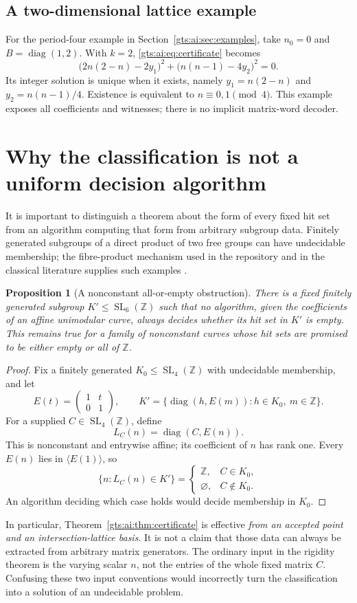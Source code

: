 \documentclass[11pt,letterpaper]{article}
\newtheorem{proposition}[theorem]{Proposition}
\theoremstyle{definition}
\theoremstyle{remark}
\newcommand{\Z}{\mathbb Z}
\newcommand{\SL}{\operatorname{SL}}
\newcommand{\diag}{\operatorname{diag}}
\begin{document}
\subsection{A two-dimensional lattice example}
For the period-four example in Section~\ref{gts:ai:sec:examples}, take $n_0=0$ and $B=\diag(1,2)$. With $k=2$, \eqref{gts:ai:eq:certificate} becomes
\[
 \bigl(2n(2-n)-2y_1\bigr)^2+
 \bigl(n(n-1)-4y_2\bigr)^2=0.
\]
Its integer solution is unique when it exists, namely
$y_1=n(2-n)$ and $y_2=n(n-1)/4$. Existence is equivalent to $n\equiv0,1\pmod4$. This example exposes all coefficients and witnesses; there is no implicit matrix-word decoder.

\section{Why the classification is not a uniform decision algorithm}\label{gts:ai:sec:uniformity}
It is important to distinguish a theorem about the form of every fixed hit set from an algorithm computing that form from arbitrary subgroup data. Finitely generated subgroups of a direct product of two free groups can have undecidable membership; the fibre-product mechanism used in the repository and in the classical literature supplies such examples \cite{ai-bogopolski,ai-repoquadratic}.

\begin{proposition}[A nonconstant all-or-empty obstruction]\label{gts:ai:prop:uniform}
There is a fixed finitely generated subgroup $K'\le\SL_6(\Z)$ such that no algorithm, given the coefficients of an affine unimodular curve, always decides whether its hit set in $K'$ is empty. This remains true for a family of nonconstant curves whose hit sets are promised to be either empty or all of $\Z$.
\end{proposition}
\begin{proof}
Fix a finitely generated $K_0\le\SL_4(\Z)$ with undecidable membership, and let
\[
 E(t)=\begin{pmatrix}1&t\\0&1\end{pmatrix},\qquad
 K'=\{\diag(h,E(m)):h\in K_0,\ m\in\Z\}.
\]
For a supplied $C\in\SL_4(\Z)$, define
\[
 L_C(n)=\diag(C,E(n)).
\]
This is nonconstant and entrywise affine; its coefficient of $n$ has rank one. Every $E(n)$ lies in $\langle E(1)\rangle$, so
\[
 \{n:L_C(n)\in K'\}=
 \begin{cases}\Z,&C\in K_0,\\\varnothing,&C\notin K_0.\end{cases}
\]
An algorithm deciding which case holds would decide membership in $K_0$.
\end{proof}
In particular, Theorem~\ref{gts:ai:thm:certificate} is effective \emph{from an accepted point and an intersection-lattice basis}. It is not a claim that those data can always be extracted from arbitrary matrix generators. The ordinary input in the rigidity theorem is the varying scalar $n$, not the entries of the whole fixed matrix $C$. Confusing these two input conventions would incorrectly turn the classification into a solution of an undecidable problem.
\end{document}
